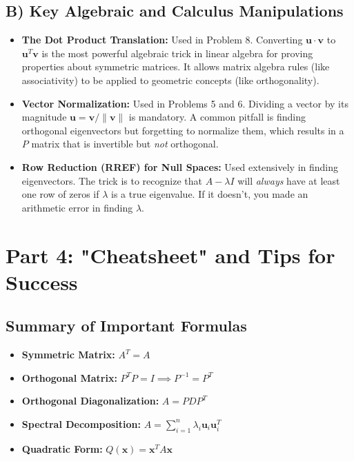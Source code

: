 \documentclass[11pt, letterpaper]{article}
\theoremstyle{definition}
\theoremstyle{remark}
\begin{document}
\subsection{B) Key Algebraic and Calculus Manipulations}
\begin{itemize}
    \item \textbf{The Dot Product Translation:} Used in Problem 8. Converting $\mathbf{u} \cdot \mathbf{v}$ to $\mathbf{u}^T \mathbf{v}$ is the most powerful algebraic trick in linear algebra for proving properties about symmetric matrices. It allows matrix algebra rules (like associativity) to be applied to geometric concepts (like orthogonality).
    \item \textbf{Vector Normalization:} Used in Problems 5 and 6. Dividing a vector by its magnitude $\mathbf{u} = \mathbf{v} / \|\mathbf{v}\|$ is mandatory. A common pitfall is finding orthogonal eigenvectors but forgetting to normalize them, which results in a $P$ matrix that is invertible but \textit{not} orthogonal.
    \item \textbf{Row Reduction (RREF) for Null Spaces:} Used extensively in finding eigenvectors. The trick is to recognize that $A - \lambda I$ will \textit{always} have at least one row of zeros if $\lambda$ is a true eigenvalue. If it doesn't, you made an arithmetic error in finding $\lambda$.
\end{itemize}

\newpage
\section{Part 4: "Cheatsheet" and Tips for Success}

\subsection{Summary of Important Formulas}
\begin{itemize}
    \item \textbf{Symmetric Matrix:} $A^T = A$
    \item \textbf{Orthogonal Matrix:} $P^T P = I \implies P^{-1} = P^T$
    \item \textbf{Orthogonal Diagonalization:} $A = P D P^T$
    \item \textbf{Spectral Decomposition:} $A = \sum_{i=1}^n \lambda_i \mathbf{u}_i \mathbf{u}_i^T$
    \item \textbf{Quadratic Form:} $Q(\mathbf{x}) = \mathbf{x}^T A \mathbf{x}$
\end{itemize}
\end{document}
